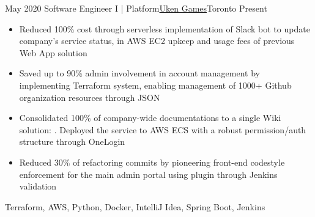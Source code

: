 %
%
%
\begin{experiences}
  \experience
    {May 2020}   {Software Engineer I | Platform}{\href{https://uken.com}{Uken Games}}{Toronto}
    {Present} {
                    \begin{itemize}
                        \item Reduced 100\% cost through serverless implementation of Slack bot to update company's service status, in AWS EC2 upkeep and usage fees of previous Web App solution
                        
                        \item Saved up to 90\% admin involvement in account management by implementing Terraform system, enabling management of 1000+ Github organization resources through JSON
                        
                        \item Consolidated 100\% of company-wide documentations to a single Wiki solution: . Deployed the service to AWS ECS with a robust permission/auth structure through OneLogin 

                        \item Reduced 30\% of refactoring commits by pioneering front-end codestyle enforcement for the main admin portal using   plugin through Jenkins validation
                    \end{itemize}
                    }
                    {Terraform, AWS, Python, Docker, IntelliJ Idea, Spring Boot, Jenkins}
\end{experiences}
